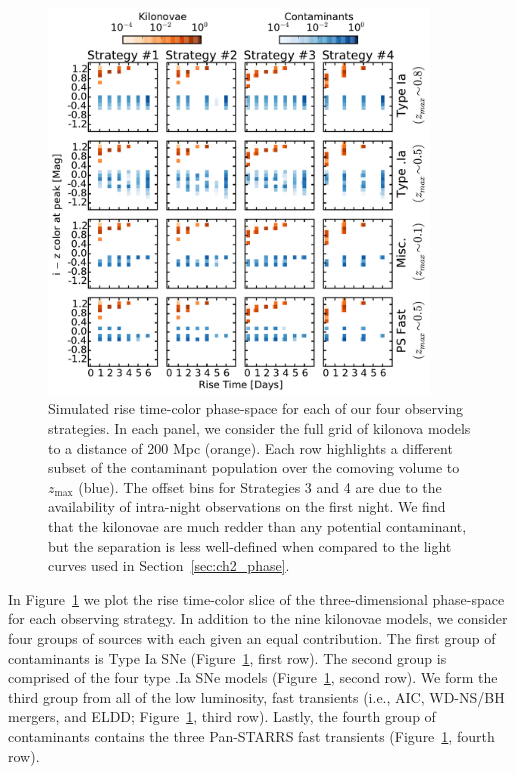\begin{figure}[t!]
\centering
\includegraphics[width=0.9\textwidth]{./figs/chapter2/ch2_f8.pdf}
\caption{Simulated rise time-color phase-space for each of our four observing strategies. In each panel, we consider the full grid of kilonova models to a distance of 200 Mpc (orange). Each row highlights a different subset of the contaminant population over the comoving volume to $z_{\text{max}}$ (blue). The offset bins for Strategies 3 and 4 are due to the availability of intra-night observations on the first night. We find that the kilonovae are much redder than any potential contaminant, but the separation is less well-defined when compared to the light curves used in Section~\ref{sec:ch2_phase}.}
\label{fig:ch2_mcphasecol}
\end{figure}

In Figure~\ref{fig:ch2_mcphasecol} we plot the rise time-color slice of the three-dimensional phase-space for each observing strategy. In addition to the nine kilonovae models, we consider four groups of sources with each given an equal contribution. The first group of contaminants is Type Ia SNe (Figure~\ref{fig:ch2_mcphasecol}, first row). The second group is comprised of the four type .Ia SNe models (Figure~\ref{fig:ch2_mcphasecol}, second row). We form the third group from all of the low luminosity, fast transients (i.e., AIC, WD-NS/BH mergers, and ELDD; Figure~\ref{fig:ch2_mcphasecol}, third row). Lastly, the fourth group of contaminants contains the three Pan-STARRS fast transients (Figure~\ref{fig:ch2_mcphasecol}, fourth row).

